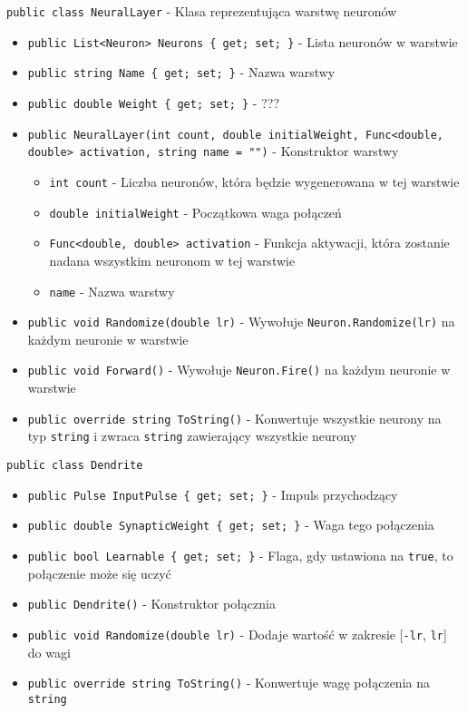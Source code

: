 \documentclass[12pt,a4paper]{article}
\begin{document}
\lstinline{public class NeuralLayer} - Klasa reprezentująca warstwę neuronów
\begin{itemize}
    \item \lstinline|public List<Neuron> Neurons { get; set; }| - Lista neuronów w warstwie
    \item \lstinline|public string Name { get; set; }| - Nazwa warstwy
    \item \lstinline|public double Weight { get; set; }| - ???
    \item \lstinline|public NeuralLayer(int count, double initialWeight, Func<double, double> activation, string name = "")| - Konstruktor warstwy
          \begin{itemize}
              \item \lstinline{int count} - Liczba neuronów, która będzie wygenerowana w tej warstwie
              \item \lstinline{double initialWeight} - Początkowa waga połączeń
              \item \lstinline{Func<double, double> activation} - Funkcja aktywacji, która zostanie nadana wszystkim neuronom w tej warstwie
              \item \lstinline{name} - Nazwa warstwy
          \end{itemize}
    \item \lstinline|public void Randomize(double lr)| - Wywołuje \lstinline{Neuron.Randomize(lr)} na każdym neuronie w warstwie
    \item \lstinline|public void Forward()| - Wywołuje \lstinline{Neuron.Fire()} na każdym neuronie w warstwie
    \item \lstinline|public override string ToString()| - Konwertuje wszystkie neurony na typ \lstinline{string} i zwraca \lstinline{string} zawierający wszystkie neurony
\end{itemize}


\lstinline{public class Dendrite}
\begin{itemize}
    \item \lstinline|public Pulse InputPulse { get; set; }| - Impuls przychodzący
    \item \lstinline|public double SynapticWeight { get; set; }| - Waga tego połączenia
    \item \lstinline|public bool Learnable { get; set; }| - Flaga, gdy ustawiona na \lstinline{true}, to połączenie może się uczyć
    \item \lstinline|public Dendrite()| - Konstruktor połącznia
    \item \lstinline|public void Randomize(double lr)| - Dodaje wartość w zakresie [\lstinline{-lr}, \lstinline{lr}] do wagi
    \item \lstinline|public override string ToString()| - Konwertuje wagę połączenia na \lstinline{string}
\end{itemize}
\end{document}

